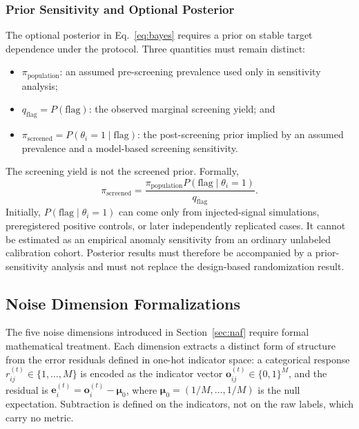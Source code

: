 \documentclass[11pt,letterpaper]{article}
\begin{document}
\subsubsection{Prior Sensitivity and Optional Posterior}
\label{sec:prior}
The optional posterior in Eq.~\ref{eq:bayes} requires a prior on stable target dependence under the protocol. Three quantities must remain distinct:
\begin{itemize}[nosep]
\item $\pi_{\mathrm{population}}$: an assumed pre-screening prevalence used only in sensitivity analysis;
\item $q_{\mathrm{flag}}=P(\mathrm{flag})$: the observed marginal screening yield; and
\item $\pi_{\mathrm{screened}}=P(\theta_i=1\mid\mathrm{flag})$: the post-screening prior implied by an assumed prevalence and a model-based screening sensitivity.
\end{itemize}
The screening yield is not the screened prior. Formally,
\begin{equation}
\pi_{\mathrm{screened}}=
\frac{\pi_{\mathrm{population}}P(\mathrm{flag}\mid\theta_i=1)}{q_{\mathrm{flag}}}.
\label{eq:piscreened}
\end{equation}
Initially, $P(\mathrm{flag}\mid\theta_i=1)$ can come only from injected-signal simulations, preregistered positive controls, or later independently replicated cases. It cannot be estimated as an empirical anomaly sensitivity from an ordinary unlabeled calibration cohort. Posterior results must therefore be accompanied by a prior-sensitivity analysis and must not replace the design-based randomization result.

\subsection{Noise Dimension Formalizations}

The five noise dimensions introduced in Section~\ref{sec:naf} require formal mathematical treatment. Each dimension extracts a distinct form of structure from the error residuals defined in one-hot indicator space: a categorical response $r_{ij}^{(t)} \in \{1, \ldots, M\}$ is encoded as the indicator vector $\mathbf{o}_{ij}^{(t)} \in \{0,1\}^M$, and the residual is $\mathbf{e}_i^{(t)} = \mathbf{o}_i^{(t)} - \boldsymbol{\mu}_0$, where $\boldsymbol{\mu}_0 = (1/M, \ldots, 1/M)$ is the null expectation. Subtraction is defined on the indicators, not on the raw labels, which carry no metric.
\end{document}
